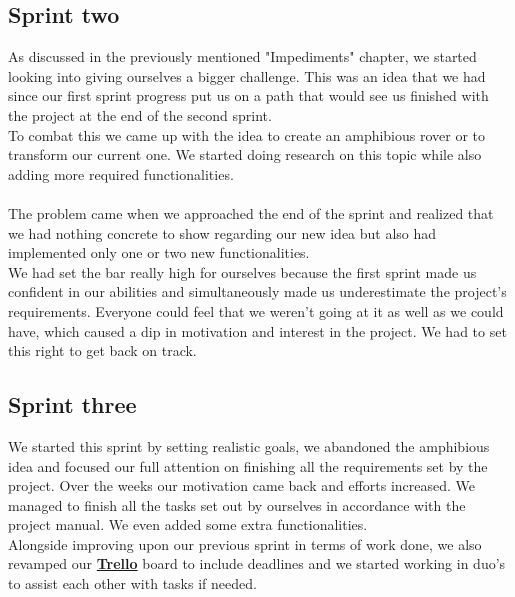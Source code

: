 \documentclass[12pt]{article}
\begin{document}
	\subsection{Sprint two}
	As discussed in the previously mentioned "Impediments" chapter, we started looking into giving ourselves a bigger challenge. This was an idea that we had since our first sprint progress put us on a path that would see us finished with the project at the end of the second sprint.\\
	To combat this we came up with the idea to create an amphibious rover or to transform our current one. We started doing research on this topic while also adding more required functionalities.\\
	\\The problem came when we approached the end of the sprint and realized that we had nothing concrete to show regarding our new idea but also had implemented only one or two new functionalities. \\
	We had set the bar really high for ourselves because the first sprint made us confident in our abilities and simultaneously made us underestimate the project's requirements. Everyone could feel that we weren't going at it as well as we could have, which caused a dip in motivation and interest in the project. We had to set this right to get back on track.
	\subsection{Sprint three}
	We started this sprint by setting realistic goals, we abandoned the amphibious idea and focused our full attention on finishing all the requirements set by the project. Over the weeks our motivation came back and efforts increased. We managed to finish all the tasks set out by ourselves in accordance with the project manual. We even added some extra functionalities.\\
	Alongside improving upon our previous sprint in terms of work done, we also revamped our \href{https://trello.com/b/VLCdhQAQ/sprint-3}{\textbf{Trello}} board to include deadlines and we started working in duo's to assist each other with tasks if needed.
\end{document}
